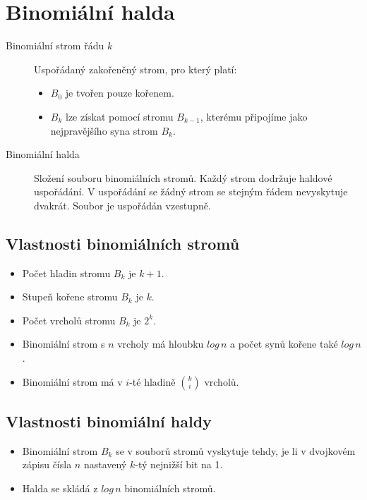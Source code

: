 \section{Binomiální halda}

  \begin{description}
    \item[Binomiální strom řádu $k$] Uspořádaný zakořeněný strom, pro který platí:
    \begin{itemize}
      \item $B_0$ je tvořen pouze kořenem.
      \item $B_k$ lze získat pomocí stromu $B_{k-1}$, kterému připojíme jako nejpravějšího syna strom $B_k$.
    \end{itemize}
    \item[Binomiální halda] Složení souboru binomiálních stromů. Každý strom dodržuje haldové uspořádání. V uspořádání se žádný strom se stejným řádem nevyskytuje dvakrát. Soubor je uspořádán vzestupně.
  \end{description}

  \subsection{Vlastnosti binomiálních stromů}
    \begin{itemize}
      \item Počet hladin stromu $B_k$ je $k+1$.
      \item Stupeň kořene stromu $B_k$ je $k$.
      \item Počet vrcholů stromu $B_k$ je $2^k$.
      \item Binomiální strom s $n$ vrcholy má hloubku $log \, n$ a počet synů kořene také $log \, n$.
      \item Binomiální strom má v $i$-té hladině $\binom{k}{i}$ vrcholů.
    \end{itemize}

    \subsection{Vlastnosti binomiální haldy}
      \begin{itemize}
        \item Binomiální strom $B_k$ se v souborů stromů vyskytuje tehdy, je li v dvojkovém zápisu čísla $n$ nastavený $k$-tý nejnižší bit na 1.
        \item Halda se skládá z $log \, n$ binomiálních stromů.
      \end{itemize}

